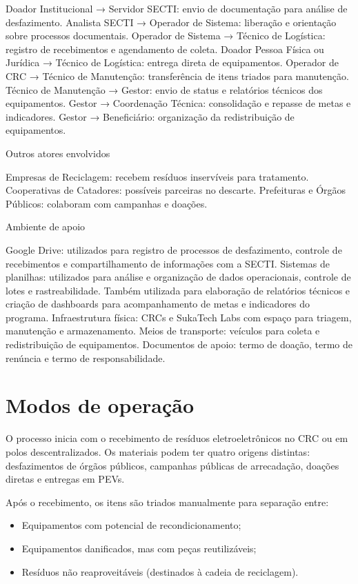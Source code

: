 \documentclass[
	12pt,				%
	openright,			%
	twoside,			%
	a4paper,			%
	english,			%
	french,				%
	spanish,			%
	brazil,				%
	]{abntex2}
\begin{document}
    Doador Institucional → Servidor SECTI: envio de documentação para análise de desfazimento.
    Analista SECTI → Operador de Sistema: liberação e orientação sobre processos documentais.
    Operador de Sistema → Técnico de Logística: registro de recebimentos e agendamento de coleta.
    Doador Pessoa Física ou Jurídica → Técnico de Logística: entrega direta de equipamentos.
    Operador de CRC → Técnico de Manutenção: transferência de itens triados para manutenção.
    Técnico de Manutenção → Gestor: envio de status e relatórios técnicos dos equipamentos.
    Gestor → Coordenação Técnica: consolidação e repasse de metas e indicadores.
    Gestor → Beneficiário: organização da redistribuição de equipamentos.

Outros atores envolvidos

    Empresas de Reciclagem: recebem resíduos inservíveis para tratamento.
    Cooperativas de Catadores: possíveis parceiras no descarte.
    Prefeituras e Órgãos Públicos: colaboram com campanhas e doações.

Ambiente de apoio

    Google Drive: utilizados para registro de processos de desfazimento, controle de recebimentos e compartilhamento de informações com a SECTI.
    Sistemas de planilhas: utilizados para análise e organização de dados operacionais, controle de lotes e rastreabilidade. Também utilizada para elaboração de relatórios técnicos e criação de dashboards para acompanhamento de metas e indicadores do programa.
    Infraestrutura física: CRCs e SukaTech Labs com espaço para triagem, manutenção e armazenamento.
    Meios de transporte: veículos para coleta e redistribuição de equipamentos.
    Documentos de apoio: termo de doação, termo de renúncia e termo de responsabilidade.


\section{Modos de operação}

O processo inicia com o recebimento de resíduos eletroeletrônicos no CRC ou em polos descentralizados. Os materiais podem ter quatro origens distintas: desfazimentos de órgãos públicos, campanhas públicas de arrecadação, doações diretas e entregas em PEVs.

Após o recebimento, os itens são triados manualmente para separação entre:

\begin{itemize}
  \item Equipamentos com potencial de recondicionamento;
  \item Equipamentos danificados, mas com peças reutilizáveis;
  \item Resíduos não reaproveitáveis (destinados à cadeia de reciclagem).
\end{itemize}
\end{document}

